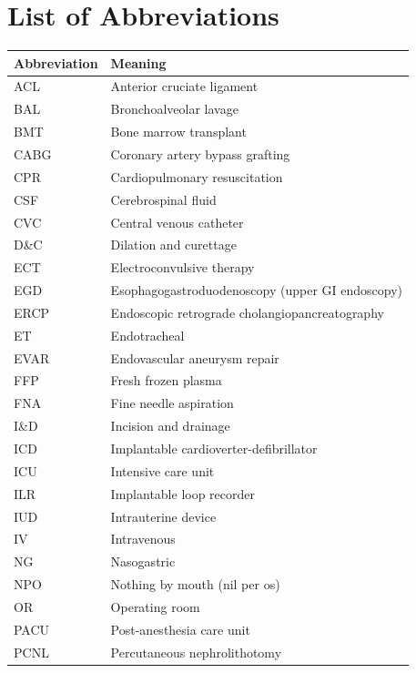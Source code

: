 \documentclass[12pt,oneside]{book}
\begin{document}
\setcounter{tocdepth}{0}
\clearpage
\tableofcontents
\newpage

\chapter*{List of Abbreviations}

\begin{footnotesize}
\begin{longtable}{@{}ll@{}}
\toprule
\textbf{Abbreviation} & \textbf{Meaning} \\
\midrule
\endhead
ACL & Anterior cruciate ligament \\
BAL & Bronchoalveolar lavage \\
BMT & Bone marrow transplant \\
CABG & Coronary artery bypass grafting \\
CPR & Cardiopulmonary resuscitation \\
CSF & Cerebrospinal fluid \\
CVC & Central venous catheter \\
D\&C & Dilation and curettage \\
ECT & Electroconvulsive therapy \\
EGD & Esophagogastroduodenoscopy (upper GI endoscopy) \\
ERCP & Endoscopic retrograde cholangiopancreatography \\
ET & Endotracheal \\
EVAR & Endovascular aneurysm repair \\
FFP & Fresh frozen plasma \\
FNA & Fine needle aspiration \\
I\&D & Incision and drainage \\
ICD & Implantable cardioverter-defibrillator \\
ICU & Intensive care unit \\
ILR & Implantable loop recorder \\
IUD & Intrauterine device \\
IV & Intravenous \\
NG & Nasogastric \\
NPO & Nothing by mouth (nil per os) \\
OR & Operating room \\
PACU & Post-anesthesia care unit \\
PCNL & Percutaneous nephrolithotomy \\

\end{longtable}
\end{footnotesize}
\end{document}
